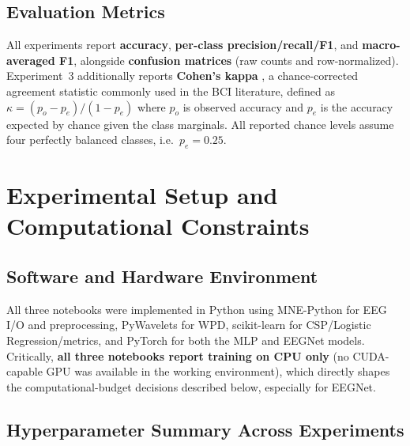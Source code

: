 \documentclass[11pt,a4paper]{article}
\begin{document}
\subsection{Evaluation Metrics}
All experiments report \textbf{accuracy}, \textbf{per-class precision/recall/F1}, and
\textbf{macro-averaged F1}, alongside \textbf{confusion matrices} (raw counts and row-normalized).
Experiment~3 additionally reports \textbf{Cohen's kappa} \cite{cohen1960kappa}, a chance-corrected
agreement statistic commonly used in the BCI literature, defined as
$\kappa = (p_o - p_e)/(1 - p_e)$ where $p_o$ is observed accuracy and $p_e$ is the accuracy expected
by chance given the class marginals. All reported chance levels assume four perfectly balanced
classes, i.e.\ $p_e = 0.25$.

\section{Experimental Setup and Computational Constraints}
\label{sec:setup}

\subsection{Software and Hardware Environment}
All three notebooks were implemented in Python using MNE-Python \cite{gramfort2013mne} for EEG I/O
and preprocessing, PyWavelets for WPD, scikit-learn for CSP/Logistic Regression/metrics, and PyTorch
\cite{paszke2019pytorch} for both the MLP and EEGNet models. Critically, \textbf{all three notebooks
report training on CPU only} (no CUDA-capable GPU was available in the working environment), which
directly shapes the computational-budget decisions described below, especially for EEGNet.

\subsection{Hyperparameter Summary Across Experiments}
\end{document}
